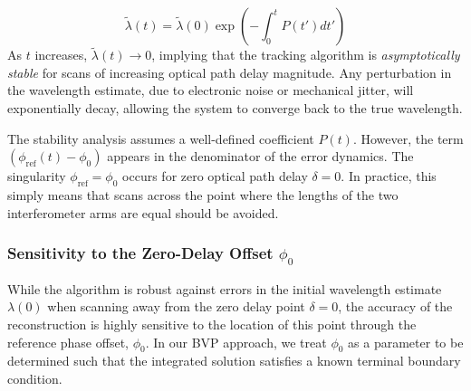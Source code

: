 \documentclass[8pt,a4paper]{report}
\begin{document}
	\begin{equation}
		\tilde{\lambda}(t) = \tilde{\lambda}(0) \exp\left( -\int_{0}^{t} P(t') dt' \right)
	\end{equation}
	As $t$ increases, $ \tilde{\lambda}(t) \to 0$, implying that the tracking algorithm is \textit{asymptotically stable} for scans of increasing optical path delay magnitude. Any perturbation in the wavelength estimate, due to electronic noise or mechanical jitter, will exponentially decay, allowing the system to converge back to the true wavelength.
	
	The stability analysis assumes a well-defined coefficient $P(t)$. However, the term $(\phi_\mathrm{ref}(t) - \phi_0)$ appears in the denominator of the error dynamics. The singularity $\phi_\mathrm{ref} = \phi_0$ occurs for zero optical path delay $\delta =0$. In practice, this simply means that scans across the point where the lengths of the two interferometer arms are equal should be avoided.
	
	\subsubsection{Sensitivity to the Zero-Delay Offset $\phi_0$}
	While the algorithm is robust against errors in the initial wavelength estimate $\lambda(0)$ when scanning away from the zero delay point $\delta = 0$, the accuracy of the reconstruction is highly sensitive to the location of this point through the reference phase offset, $\phi_0$. In our BVP approach, we treat $\phi_0$ as a parameter to be determined such that the integrated solution satisfies a known terminal boundary condition. 
	
	
	
\end{document}
